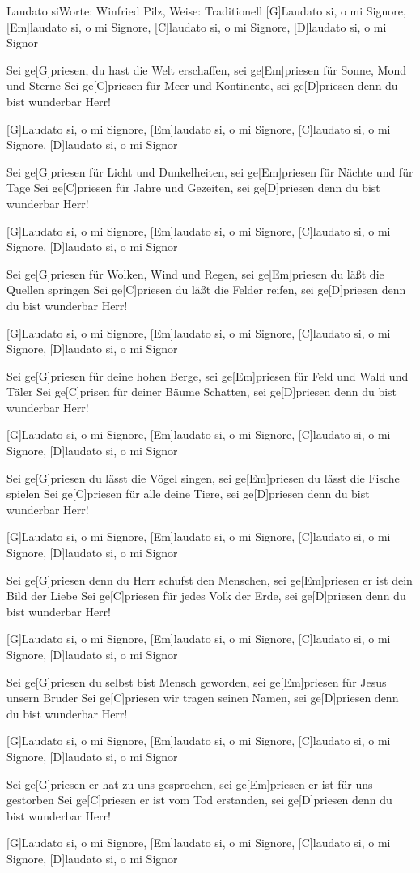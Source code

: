 \documentclass[../main.tex]{subfiles}
\begin{document}
\begin{song}{Laudato si}{Worte: Winfried Pilz, Weise: Traditionell}{}
[G]Laudato si, o mi Signore, [Em]laudato si, o mi Signore, [C]laudato si, o mi Signore, [D]laudato si, o mi Signor

Sei ge[G]priesen, du hast die Welt erschaffen, sei ge[Em]priesen für Sonne, Mond und Sterne
Sei ge[C]priesen für Meer und Kontinente, sei ge[D]priesen denn du bist wunderbar Herr!

[G]Laudato si, o mi Signore, [Em]laudato si, o mi Signore, [C]laudato si, o mi Signore, [D]laudato si, o mi Signor

Sei ge[G]priesen für Licht und Dunkelheiten, sei ge[Em]priesen für Nächte und für Tage
Sei ge[C]priesen für Jahre und Gezeiten, sei ge[D]priesen denn du bist wunderbar Herr!

[G]Laudato si, o mi Signore, [Em]laudato si, o mi Signore, [C]laudato si, o mi Signore, [D]laudato si, o mi Signor

Sei ge[G]priesen für Wolken, Wind und Regen, sei ge[Em]priesen du läßt die Quellen springen
Sei ge[C]priesen du läßt die Felder reifen, sei ge[D]priesen denn du bist wunderbar Herr!

[G]Laudato si, o mi Signore, [Em]laudato si, o mi Signore, [C]laudato si, o mi Signore, [D]laudato si, o mi Signor

Sei ge[G]priesen für deine hohen Berge, sei ge[Em]priesen für Feld und Wald und Täler
Sei ge[C]prisen für deiner Bäume Schatten, sei ge[D]priesen denn du bist wunderbar Herr!

[G]Laudato si, o mi Signore, [Em]laudato si, o mi Signore, [C]laudato si, o mi Signore, [D]laudato si, o mi Signor

Sei ge[G]priesen du lässt die Vögel singen, sei ge[Em]priesen du lässt die Fische spielen
Sei ge[C]priesen für alle deine Tiere, sei ge[D]priesen denn du bist wunderbar Herr!

[G]Laudato si, o mi Signore, [Em]laudato si, o mi Signore, [C]laudato si, o mi Signore, [D]laudato si, o mi Signor

Sei ge[G]priesen denn du Herr schufst den Menschen, sei ge[Em]priesen er ist dein Bild der Liebe
Sei ge[C]priesen für jedes Volk der Erde, sei ge[D]priesen denn du bist wunderbar Herr!

[G]Laudato si, o mi Signore, [Em]laudato si, o mi Signore, [C]laudato si, o mi Signore, [D]laudato si, o mi Signor

Sei ge[G]priesen du selbst bist Mensch geworden, sei ge[Em]priesen für Jesus unsern Bruder
Sei ge[C]priesen wir tragen seinen Namen, sei ge[D]priesen denn du bist wunderbar Herr!

[G]Laudato si, o mi Signore, [Em]laudato si, o mi Signore, [C]laudato si, o mi Signore, [D]laudato si, o mi Signor

Sei ge[G]priesen er hat zu uns gesprochen, sei ge[Em]priesen er ist für uns gestorben
Sei ge[C]priesen er ist vom Tod erstanden, sei ge[D]priesen denn du bist wunderbar Herr!

[G]Laudato si, o mi Signore, [Em]laudato si, o mi Signore, [C]laudato si, o mi Signore, [D]laudato si, o mi Signor

\end{song}
\end{document}
